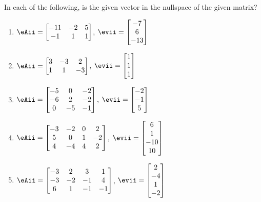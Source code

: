 \begin{exercise} \label{ex:} 
In each of the following, is the given vector in the nullspace of the given matrix?
\begin{enumerate}
\item \(\eAii=\begin{bmatrix} -11&-2&5
\\-1&1&1 \end{bmatrix}\),
\(\evii=\begin{bmatrix} -7\\6\\-13 \end{bmatrix}\)

\item \(\eAii=\begin{bmatrix} 3&-3&2
\\1&1&-3 \end{bmatrix}\),
\(\evii=\begin{bmatrix} 1
\\1
\\1 \end{bmatrix}\)

\item \(\eAii=\begin{bmatrix} -5&0&-2
\\-6&2&-2
\\0&-5&-1 \end{bmatrix}\),
\(\evii=\begin{bmatrix} -2
\\-1
\\5 \end{bmatrix}\)

\item \(\eAii=\begin{bmatrix} -3&-2&0&2
\\5&0&1&-2
\\4&-4&4&2 \end{bmatrix}\),
\(\evii=\begin{bmatrix} 6
\\1
\\-10
\\10 \end{bmatrix}\)

\item \(\eAii=\begin{bmatrix} -3&2&3&1
\\-3&-2&-1&4
\\6&1&-1&-1 \end{bmatrix}\),
\(\evii=\begin{bmatrix} 2
\\-4
\\1
\\-2 \end{bmatrix}\)


\end{enumerate}
\end{exercise}

